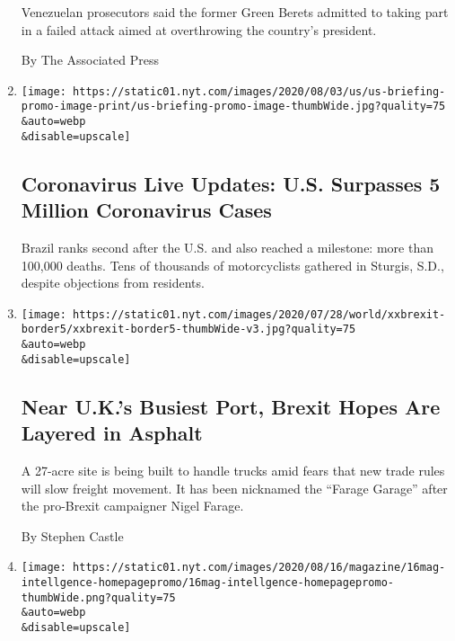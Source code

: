 \begin{enumerate}
  Venezuelan prosecutors said the former Green Berets admitted to taking
  part in a failed attack aimed at overthrowing the country's president.

  By The Associated Press
\item
  \href{/2020/08/08/world/coronavirus-updates.html}{}

  \texttt{[image: https://static01.nyt.com/images/2020/08/03/us/us-briefing-promo-image-print/us-briefing-promo-image-thumbWide.jpg?quality=75\\\&auto=webp\\\&disable=upscale]}

  \hypertarget{coronavirus-live-updates-us-surpasses-5-million-coronavirus-cases}{%
  \subsection{Coronavirus Live Updates: U.S. Surpasses 5 Million
  Coronavirus
  Cases}\label{coronavirus-live-updates-us-surpasses-5-million-coronavirus-cases}}

  Brazil ranks second after the U.S. and also reached a milestone: more
  than 100,000 deaths. Tens of thousands of motorcyclists gathered in
  Sturgis, S.D., despite objections from residents.
\item
  \href{/2020/08/08/world/europe/brexit-trucks-dover-mojo.html}{}

  \texttt{[image: https://static01.nyt.com/images/2020/07/28/world/xxbrexit-border5/xxbrexit-border5-thumbWide-v3.jpg?quality=75\\\&auto=webp\\\&disable=upscale]}

  \hypertarget{near-uks-busiest-port-brexit-hopes-are-layered-in-asphalt}{%
  \subsection{Near U.K.'s Busiest Port, Brexit Hopes Are Layered in
  Asphalt}\label{near-uks-busiest-port-brexit-hopes-are-layered-in-asphalt}}

  A 27-acre site is being built to handle trucks amid fears that new
  trade rules will slow freight movement. It has been nicknamed the
  ``Farage Garage'' after the pro-Brexit campaigner Nigel Farage.

  By Stephen Castle
\item
  \href{/2020/08/08/magazine/us-russia-intelligence.html}{}

  \texttt{[image: https://static01.nyt.com/images/2020/08/16/magazine/16mag-intellgence-homepagepromo/16mag-intellgence-homepagepromo-thumbWide.png?quality=75\\\&auto=webp\\\&disable=upscale]}


\end{enumerate}
